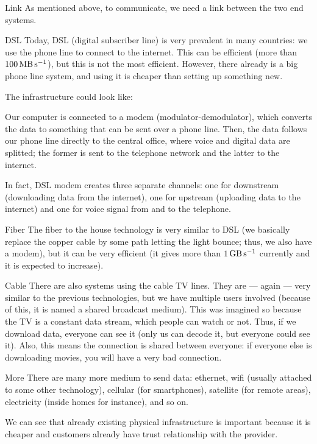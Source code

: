 \documentclass[a4paper]{article}
\begin{document}
\begin{parag}{Link}
    As mentioned above, to communicate, we need a link between the two end systems. 

    \begin{subparag}{DSL}
        Today, DSL (digital subscriber line) is very prevalent in many countries: we use the phone line to connect to the internet. This can be efficient (more than $\SI{100}{\mega\byte \per \second }$), but this is not the most efficient. However, there already is a big phone line system, and using it is cheaper than setting up something new.

        The infrastructure could look like:

        Our computer is connected to a modem (modulator-demodulator), which converts the data to something that can be sent over a phone line. Then, the data follows our phone line directly to the central office, where voice and digital data are splitted; the former is sent to the telephone network and the latter to the internet. 

        In fact, DSL modem creates three separate channels: one for downstream (downloading data from the internet), one for upstream (uploading data to the internet) and one for voice signal from and to the telephone.
    \end{subparag}

    \begin{subparag}{Fiber}
        The fiber to the house technology is very similar to DSL (we basically replace the copper cable by some path letting the light bounce; thus, we also have a modem), but it can be very efficient (it gives more than $\SI{1}{\giga\byte \per \second }$ currently and it is expected to increase).
    \end{subparag}

    \begin{subparag}{Cable}
        There are also systems using the cable TV lines. They are --- again --- very similar to the previous technologies, but we have multiple users involved (because of this, it is named a shared broadcast medium). This was imagined so because the TV is a constant data stream, which people can watch or not. Thus, if we download data, everyone can see it (only us can decode it, but everyone could see it). Also, this means the connection is shared between everyone: if everyone else is downloading movies, you will have a very bad connection.

    \end{subparag}
    
    \begin{subparag}{More}
        There are many more medium to send data: ethernet, wifi (usually attached to some other technology), cellular (for smartphones), satellite (for remote areas), electricity (inside homes for instance), and so on.
    \end{subparag}

    We can see that already existing physical infrastructure is important because it is cheaper and customers already have trust relationship with the provider.
\end{parag}
\end{document}
